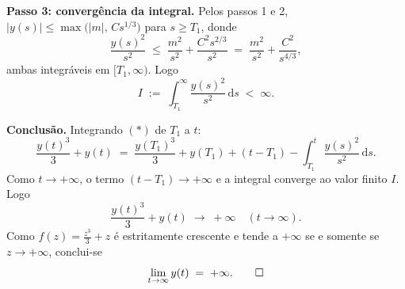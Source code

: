 \documentclass[10pt,a4paper]{amsart}
\renewcommand{\d}{\mathrm{d}}
\begin{document}
\smallskip

\noindent \textbf{Passo 3: convergência da integral.} Pelos passos 1 e 2, $|y(s)| \leq \max\bigl(|m|,\, C s^{1/3}\bigr)$ para $s \geq T_1$, donde
\[
    \frac{y(s)^2}{s^2} \;\leq\; \frac{m^2}{s^2} + \frac{C^2 s^{2/3}}{s^2} \;=\; \frac{m^2}{s^2} + \frac{C^2}{s^{4/3}},
\]
ambas integráveis em $[T_1, \infty)$. Logo
\[
    I \;:=\; \int_{T_1}^{\infty} \frac{y(s)^2}{s^2}\, \d s \;<\; \infty.
\]

\smallskip

\noindent \textbf{Conclusão.} Integrando $(\ast)$ de $T_1$ a $t$:
\[
    \frac{y(t)^3}{3} + y(t) \;=\; \frac{y(T_1)^3}{3} + y(T_1) + (t - T_1) - \int_{T_1}^t \frac{y(s)^2}{s^2}\, \d s.
\]
Como $t \to +\infty$, o termo $(t - T_1) \to +\infty$ e a integral converge ao valor finito $I$. Logo
\[
    \frac{y(t)^3}{3} + y(t) \;\longrightarrow\; +\infty \quad (t \to \infty).
\]
Como $f(z) = \tfrac{z^3}{3} + z$ é estritamente crescente e tende a $+\infty$ se e somente se $z \to +\infty$, conclui-se
\[
    \lim_{t \to \infty} y(t) \;=\; +\infty. \qed
\]
\end{document}
